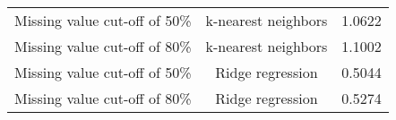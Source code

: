 \documentclass{article}\usepackage[]{graphicx}\usepackage[]{color}
\begin{document}
\begin{table}[ht]
\begin{tabular}{@{}|l|c|c|@{}}
                                                                                                                                                                                                                                                                                                                                                                                                                                                                                                                                                                                                Missing value cut-off of 50\% & k-nearest neighbors & 1.0622 \\ 
                                                                                                                                                                                                                                                                                                                                                                                                                                                                                                                                                                                                Missing value cut-off of 80\% & k-nearest neighbors & 1.1002 \\ 
                                                                                                                                                                                                                                                                                                                                                                                                                                                                                                                                                                                                Missing value cut-off of 50\% & Ridge regression & 0.5044 \\
                                                                                                                                                                                                                                                                                                                                                                                                                                                                                                                                                                                                Missing value cut-off of 80\% & Ridge regression & 0.5274 \\

\end{tabular}
\end{table}
\end{document}
